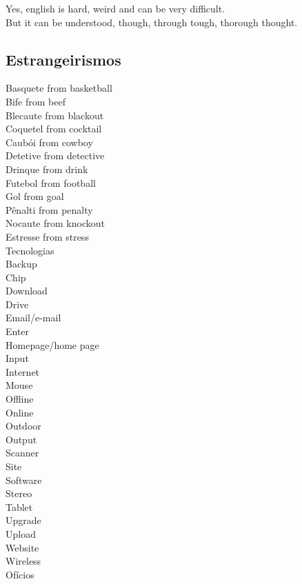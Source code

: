 \documentclass[12pt,a4paper]{article} %
\begin{document}
Yes, english is hard, weird and can be very difficult.\\
But it can be understood, though, through tough, thorough thought.\\

\subsection{Estrangeirismos}

Basquete from basketball\\
Bife from beef\\
Blecaute from blackout\\
Coquetel from cocktail\\
Caubói from cowboy\\
Detetive from detective\\
Drinque from drink\\
Futebol from football\\
Gol from goal\\
Pênalti from penalty\\
Nocaute from knockout\\
Estresse from stress\\

Tecnologias\\

Backup\\
Chip\\
Download\\
Drive\\
Email/e-mail\\
Enter\\
Homepage/home page\\
Input\\
Internet\\
Mouse\\
Offline\\
Online\\
Outdoor\\
Output\\
Scanner\\ 
Site\\
Software\\
Stereo\\
Tablet\\
Upgrade\\
Upload\\
Website\\
Wireless\\

Ofícios\\
\end{document}
